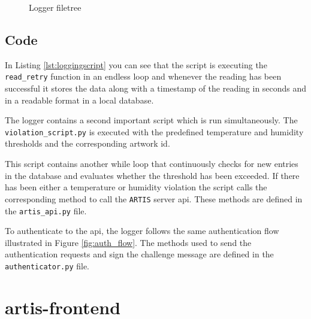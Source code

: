 \begin{figure}[h]
    \centering
        
    \caption{Logger filetree}
    \label{fig:artis-logger-filetree}
\end{figure}

\subsection{Code}


In Listing \ref{lst:loggingscript} you can see that the script is executing the \texttt{read\_retry} function in an endless loop and whenever the reading has been successful it stores the data along with a timestamp of the reading in seconds and in a readable format in a local database.

The logger contains a second important script which is run simultaneously. The \texttt{violation\_script.py} is executed with the predefined temperature and humidity thresholds and the corresponding artwork id.



This script contains another while loop that continuously checks for new entries in the database and evaluates whether the threshold has been exceeded. If there has been either a temperature or humidity violation the script calls the corresponding method to call the \texttt{ARTIS} server \gls{api}. These methods are defined in the \texttt{artis\_api.py} file.

To authenticate to the \gls{api}, the logger follows the same authentication flow illustrated in Figure \ref{fig:auth_flow}. The methods used to send the authentication requests and sign the challenge message are defined in the \texttt{authenticator.py} file.

\clearpage
\section{artis-frontend}
